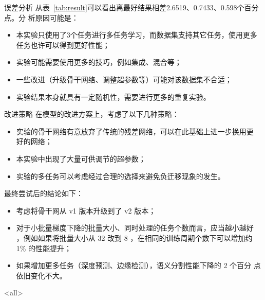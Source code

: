 \documentclass[../main]{subfiles}
\begin{document}
\begin{frame}{误差分析}
  从表~\ref{tab:result}可以看出离最好结果相差2.6519、0.7433、0.598个百分点。分
  析原因可能是：

  \begin{itemize}
    \item 本实验只使用了3个任务进行多任务学习，而数据集支持其它任务，使用更多
      任务也许可以得到更好性能；
    \item 实验可能需要使用更多的技巧，例如集成、混合等；
    \item 一些改进（升级骨干网络、调整超参数等）可能对该数据集不合适；
    \item 实验结果本身就具有一定随机性，需要进行更多的重复实验。
  \end{itemize}
\end{frame}

\begin{frame}{改进策略}
  在模型的改进方案上，考虑了以下几种策略：

  \begin{itemize}
    \item 实验的骨干网络有意放弃了传统的残差网络，可以在此基础上进一步换用更
      好的网络；
    \item 本实验中出现了大量可供调节的超参数；
    \item 实验的多任务可以考虑经过合理的选择来避免负迁移现象的发生。
  \end{itemize}

  最终尝试后的结论如下：
  \begin{itemize}
    \item 考虑将骨干网从 v1 版本升级到了 v2 版本；
    \item 对于小批量梯度下降的批量大小、同时处理的任务个数而言，应当越小越好
      ，例如如果将批量大小从 32 改到 8 ，在相同的训练周期个数下可以增加约 1\%
      的性能提升；
    \item 如果增加更多任务（深度预测、边缘检测），语义分割性能下降的 2 个百分
      点依旧变化不大。
  \end{itemize}
\end{frame}

\mode<all>
\end{document}
